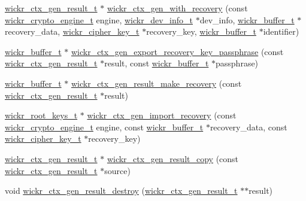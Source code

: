 \begin{DoxyCompactItemize}
\item 
\mbox{\hyperlink{structwickr__ctx__gen__result}{wickr\+\_\+ctx\+\_\+gen\+\_\+result\+\_\+t}} $\ast$ \mbox{\hyperlink{group__wickr__ctx_ga2e9c63af0e76f1977844ea2dc895e90a}{wickr\+\_\+ctx\+\_\+gen\+\_\+with\+\_\+recovery}} (const \mbox{\hyperlink{structwickr__crypto__engine}{wickr\+\_\+crypto\+\_\+engine\+\_\+t}} engine, \mbox{\hyperlink{structwickr__dev__info}{wickr\+\_\+dev\+\_\+info\+\_\+t}} $\ast$dev\+\_\+info, \mbox{\hyperlink{structwickr__buffer}{wickr\+\_\+buffer\+\_\+t}} $\ast$recovery\+\_\+data, \mbox{\hyperlink{structwickr__cipher__key}{wickr\+\_\+cipher\+\_\+key\+\_\+t}} $\ast$recovery\+\_\+key, \mbox{\hyperlink{structwickr__buffer}{wickr\+\_\+buffer\+\_\+t}} $\ast$identifier)
\item 
\mbox{\hyperlink{structwickr__buffer}{wickr\+\_\+buffer\+\_\+t}} $\ast$ \mbox{\hyperlink{group__wickr__ctx_ga2dadd40adc0217dd337ee6cf745cbc12}{wickr\+\_\+ctx\+\_\+gen\+\_\+export\+\_\+recovery\+\_\+key\+\_\+passphrase}} (const \mbox{\hyperlink{structwickr__ctx__gen__result}{wickr\+\_\+ctx\+\_\+gen\+\_\+result\+\_\+t}} $\ast$result, const \mbox{\hyperlink{structwickr__buffer}{wickr\+\_\+buffer\+\_\+t}} $\ast$passphrase)
\item 
\mbox{\hyperlink{structwickr__buffer}{wickr\+\_\+buffer\+\_\+t}} $\ast$ \mbox{\hyperlink{group__wickr__ctx_gaa32727731391f1e3fbde26094924b533}{wickr\+\_\+ctx\+\_\+gen\+\_\+result\+\_\+make\+\_\+recovery}} (const \mbox{\hyperlink{structwickr__ctx__gen__result}{wickr\+\_\+ctx\+\_\+gen\+\_\+result\+\_\+t}} $\ast$result)
\item 
\mbox{\hyperlink{structwickr__root__keys}{wickr\+\_\+root\+\_\+keys\+\_\+t}} $\ast$ \mbox{\hyperlink{group__wickr__ctx_ga0bde95494141673604b9e4e1f7954e2c}{wickr\+\_\+ctx\+\_\+gen\+\_\+import\+\_\+recovery}} (const \mbox{\hyperlink{structwickr__crypto__engine}{wickr\+\_\+crypto\+\_\+engine\+\_\+t}} engine, const \mbox{\hyperlink{structwickr__buffer}{wickr\+\_\+buffer\+\_\+t}} $\ast$recovery\+\_\+data, const \mbox{\hyperlink{structwickr__cipher__key}{wickr\+\_\+cipher\+\_\+key\+\_\+t}} $\ast$recovery\+\_\+key)
\item 
\mbox{\hyperlink{structwickr__ctx__gen__result}{wickr\+\_\+ctx\+\_\+gen\+\_\+result\+\_\+t}} $\ast$ \mbox{\hyperlink{group__wickr__ctx_gae095a8cb40d209090212136f8580dc77}{wickr\+\_\+ctx\+\_\+gen\+\_\+result\+\_\+copy}} (const \mbox{\hyperlink{structwickr__ctx__gen__result}{wickr\+\_\+ctx\+\_\+gen\+\_\+result\+\_\+t}} $\ast$source)
\item 
void \mbox{\hyperlink{group__wickr__ctx_ga865854408d22e4697eebe5bc129cc6b1}{wickr\+\_\+ctx\+\_\+gen\+\_\+result\+\_\+destroy}} (\mbox{\hyperlink{structwickr__ctx__gen__result}{wickr\+\_\+ctx\+\_\+gen\+\_\+result\+\_\+t}} $\ast$$\ast$result)
$$
\end{DoxyCompactItemize}
